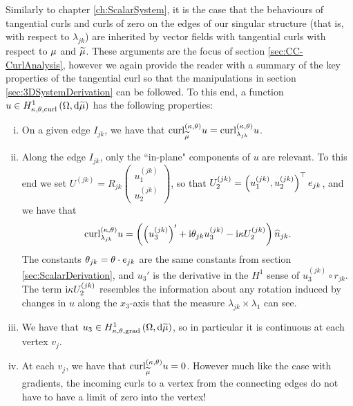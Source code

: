 Similarly to chapter \ref{ch:ScalarSystem}, it is the case that the behaviours of tangential curls and curls of zero on the edges of our singular structure (that is, with respect to $\lambda_{jk}$) are inherited by vector fields with tangential curls with respect to $\mu$ and $\widetilde{\mu}$.
These arguments are the focus of section \ref{sec:CC-CurlAnalysis}, however we again provide the reader with a summary of the key properties of the tangential curl so that the manipulations in section \ref{sec:3DSystemDerivation} can be followed.
To this end, a function $u\in H^1_{\kappa,\theta,\mathrm{curl}}\left( \Omega, \mathrm{d}\widetilde{\mu} \right)$ has the following properties:
\begin{enumerate}[(i)]
	\item On a given edge $I_{jk}$, we have that $\mathrm{curl}_{\widetilde{\mu}}^{\left( \kappa, \theta \right)}u = \mathrm{curl}_{\lambda_{jk}}^{\left( \kappa, \theta \right)}u$.
	\item Along the edge $I_{jk}$, only the ``in-plane" components of $u$ are relevant.
	To this end we set $U^{(jk)} = R_{jk}\begin{pmatrix} u^{(jk)}_1 \\ u^{(jk)}_2 \end{pmatrix}$, so that $U_2^{(jk)} = \left( u_1^{(jk)},u_2^{(jk)} \right)^\top e_{jk}$, and we have that
	\begin{align*}
		\mathrm{curl}_{\lambda_{jk}}^{\left( \kappa, \theta \right)}u = \left( \left( u_3^{(jk)} \right)' + \mathrm{i}\theta_{jk}u_3^{(jk)} - \mathrm{i}\kappa U^{(jk)}_2 \right)\widehat{n}_{jk}.
	\end{align*}
	The constants $\theta_{jk}=\theta\cdot e_{jk}$ are the same constants from section \ref{sec:ScalarDerivation}, and $u_3'$ is the derivative in the $H^1$ sense of $u^{(jk)}_3\circ r_{jk}$.
	The term $\mathrm{i}\kappa U^{(jk)}_2$ resembles the information about any rotation induced by changes in $u$ along the $x_3$-axis that the measure $\lambda_{jk}\times\lambda_1$ can see.
	\item We have that $u_3\in H^1_{\kappa,\theta,\mathrm{grad}}\left( \Omega, \mathrm{d}\widetilde{\mu} \right)$, so in particular it is continuous at each vertex $v_j$.
	\item At each $v_j$, we have that $\mathrm{curl}_{\widetilde{\mu}}^{\left( \kappa, \theta \right)}u = 0$.
	However much like the case with gradients, the incoming curls to a vertex from the connecting edges do not have to have a limit of zero into the vertex!
\end{enumerate}